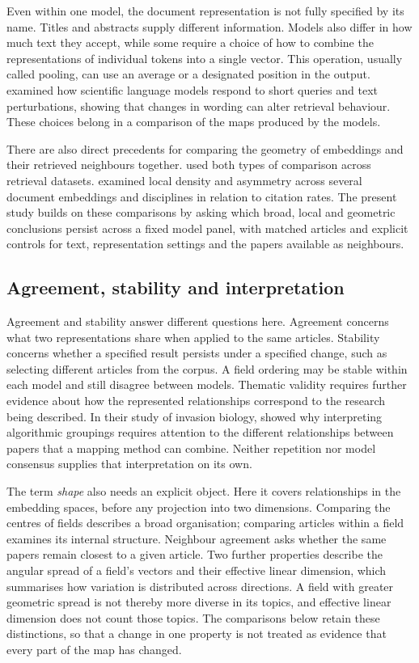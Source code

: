 \documentclass[12pt]{article}
\begin{document}
Even within one model, the document representation is not fully specified by its name. Titles and abstracts supply different information. Models also differ in how much text they accept, while some require a choice of how to combine the representations of individual tokens into a single vector. This operation, usually called pooling, can use an average or a designated position in the output. \citet{singh-singh-2022-inefficiency} examined how scientific language models respond to short queries and text perturbations, showing that changes in wording can alter retrieval behaviour. These choices belong in a comparison of the maps produced by the models.

There are also direct precedents for comparing the geometry of embeddings and their retrieved neighbours together. \citet{ref4e1e0d5582} used both types of comparison across retrieval datasets. \citet{ref6da178065c} examined local density and asymmetry across several document embeddings and disciplines in relation to citation rates. The present study builds on these comparisons by asking which broad, local and geometric conclusions persist across a fixed model panel, with matched articles and explicit controls for text, representation settings and the papers available as neighbours.

\subsection{Agreement, stability and interpretation}
Agreement and stability answer different questions here. Agreement concerns what two representations share when applied to the same articles. Stability concerns whether a specified result persists under a specified change, such as selecting different articles from the corpus. A field ordering may be stable within each model and still disagree between models. Thematic validity requires further evidence about how the represented relationships correspond to the research being described. In their study of invasion biology, \citet{QSSreviewQ17} showed why interpreting algorithmic groupings requires attention to the different relationships between papers that a mapping method can combine. Neither repetition nor model consensus supplies that interpretation on its own.

The term \emph{shape} also needs an explicit object. Here it covers relationships in the embedding spaces, before any projection into two dimensions. Comparing the centres of fields describes a broad organisation; comparing articles within a field examines its internal structure. Neighbour agreement asks whether the same papers remain closest to a given article. Two further properties describe the angular spread of a field's vectors and their effective linear dimension, which summarises how variation is distributed across directions. A field with greater geometric spread is not thereby more diverse in its topics, and effective linear dimension does not count those topics. The comparisons below retain these distinctions, so that a change in one property is not treated as evidence that every part of the map has changed.
\end{document}
